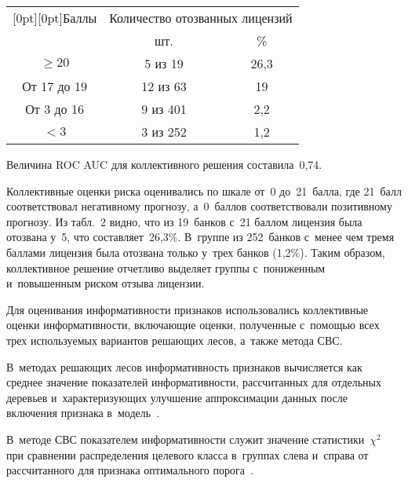 \begin{multicols}{2}
{\begin{center}
{}

\vspace*{6pt}

\small
\begin{tabular}{|c|c|c|}
\hline
\multicolumn{1}{|c|}{\raisebox{-6pt}[0pt][0pt]{Баллы}}& \multicolumn{2}{c|}{Количество отозванных лицензий}\\
\cline{2-3}
&\hspace*{10mm}шт.\hspace*{10mm} &\%\\
\hline
$\geq 20$& 5 из 19\hphantom{9} & 26,3\hphantom{9}\\
От 17 до 19& 12 из 63\hphantom{99} & 19\hphantom{99,}\\
От 3 до 16 & 9 из 401& 2,2\\
$<3$& 3 из 252 & 1,2\\
\hline
\end{tabular}
\end{center}}
\vspace*{12pt}

\noindent
Величина ROC AUC для коллективного решения составила~0,74. 
     
     Коллективные оценки риска оценивались по шкале от~0 до~21~балла, 
где 21~балл соответствовал негативному прогнозу, а~0~баллов 
соответствовали позитивному прогнозу. Из табл.~2 видно, что из 19~банков 
с~21 баллом лицензия была отозвана у~5, что составляет~26,3\%. В~группе 
из 252~банков с~менее чем тремя баллами лицензия была отозвана только 
у~трех банков (1,2\%). Таким образом, коллективное решение отчетливо 
выделяет группы с~пониженным и~повышенным риском отзыва лицензии. 


      
      Для оценивания информативности признаков использовались 
коллективные оценки ин\-фор\-ма\-тив\-ности, включающие оценки, полученные %
с~помощью всех трех используемых вариантов ре\-ша\-ющих лесов, а~также 
метода СВС. 

В~методах {решающих} лесов информативность признаков 
вычисляется как среднее значение показателей информативности, 
рассчитанных для отдельных %
деревьев и~характеризующих улучшение 
аппроксимации данных после включения признака в~модель~\cite{9-sen}. 

В~методе СВС показателем информативности служит значение 
статистики~$\chi^2$ при сравнении распределения целевого класса в~группах 
слева и~справа от рассчитанного для признака оптимального  
порога~\cite{6-sen}.
      

\end{multicols}
